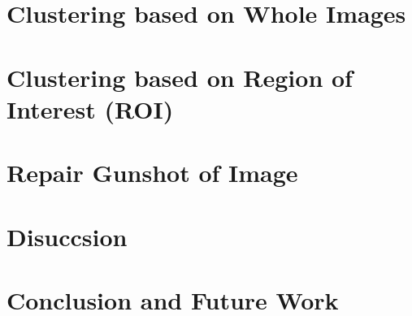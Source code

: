 \documentclass{article}
\begin{document}
\hypertarget{clustering-based-on-whole-images}{%
\section{Clustering based on Whole
Images}\label{clustering-based-on-whole-images}}

\hypertarget{clustering-based-on-region-of-interest-roi}{%
\section{Clustering based on Region of Interest
(ROI)}\label{clustering-based-on-region-of-interest-roi}}

\hypertarget{repair-gunshot-of-image}{%
\section{Repair Gunshot of Image}\label{repair-gunshot-of-image}}

\hypertarget{disuccsion}{%
\section{Disuccsion}\label{disuccsion}}

\hypertarget{conclusion-and-future-work}{%
\section{Conclusion and Future Work}\label{conclusion-and-future-work}}



\end{document}

